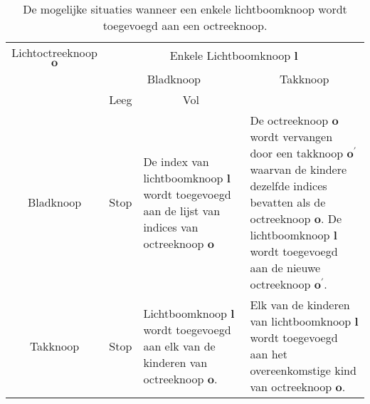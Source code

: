 \begin{table}
  \begin{tabularx}{\textwidth}{ccXX}\toprule
    Lichtoctreeknoop $\mathbf{o}$ & \multicolumn{3}{c}{Enkele Lichtboomknoop $\mathbf{l}$}                            \\
                                  & \multicolumn{2}{c}{Bladknoop}                      & \multicolumn{1}{c}{Takknoop} \\
                                  & \multicolumn{1}{c}{Leeg} & \multicolumn{1}{c}{Vol} &                              \\ \midrule
    Bladknoop &
      Stop &
    
      De index van lichtboomknoop $\mathbf{l}$ wordt toegevoegd aan de lijst van
      indices van octreeknoop $\mathbf{o}$ &

      De octreeknoop $\mathbf{o}$ wordt vervangen door een takknoop
      $\mathbf{o}^\prime$ waarvan de kindere dezelfde indices bevatten als de
      octreeknoop $\mathbf{o}$. De lichtboomknoop $\mathbf{l}$ wordt toegevoegd
      aan de nieuwe octreeknoop $\mathbf{o}^\prime$. \\

    Takknoop &
      Stop &

      Lichtboomknoop $\mathbf{l}$ wordt toegevoegd aan elk van de kinderen van
      octreeknoop $\mathbf{o}$. &

      Elk van de kinderen van lichtboomknoop $\mathbf{l}$ wordt toegevoegd aan
      het overeenkomstige kind van octreeknoop $\mathbf{o}$. \\ \bottomrule
  \end{tabularx}
  \caption{De mogelijke situaties wanneer een enkele lichtboomknoop wordt
           toegevoegd aan een octreeknoop.}
  \label{tbl:hs-lichtoctree}
\end{table}
